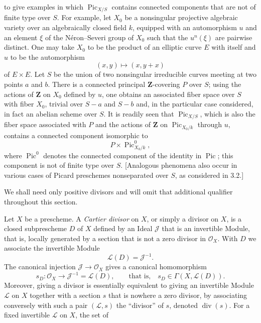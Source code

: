 to give examples in which $\operatorname{Pic}_{X/S}$ contains connected
components that are not of finite type over $S$. For example, let $X_0$ be a
nonsingular projective algebraic variety over an algebraically closed field
$k$, equipped with an automorphism $u$ and an element $\xi$ of the
Néron--Severi group of $X_0$ such that the $u^n(\xi)$ are pairwise distinct.
One may take $X_0$ to be the product of an elliptic curve $E$ with itself and
$u$ to be the automorphism
\[
(x,y)\longmapsto(x,y+x)
\]
of $E\times E$. Let $S$ be the union of two nonsingular irreducible curves
meeting at two points $a$ and $b$. There is a connected principal
$\mathbf Z$-covering $P$ over $S$; using the actions of $\mathbf Z$ on $X_0$
defined by $u$, one obtains an associated fiber space over $S$ with fiber
$X_0$, trivial over $S-a$ and $S-b$ and, in the particular case considered,
in fact an abelian scheme over $S$. It is readily seen that
$\operatorname{Pic}_{X/S}$, which is also the fiber space associated with $P$
and the actions of $\mathbf Z$ on $\operatorname{Pic}_{X_0/k}$ through $u$,
contains a connected component isomorphic to
\[
P\times\operatorname{Pic}^{0}_{X_0/k},
\]
where $\operatorname{Pic}^{0}$ denotes the connected component of the identity
in $\operatorname{Pic}$; this component is not of finite type over $S$.
[Analogous phenomena also occur in various cases of Picard preschemes
nonseparated over $S$, as considered in 3.2.]


We shall need only positive divisors and will omit that additional qualifier
throughout this section.

Let $X$ be a prescheme. A \emph{Cartier divisor} on $X$, or simply a divisor on
$X$, is a closed subprescheme $D$ of $X$ defined by an Ideal $\mathcal J$ that
is an invertible Module, that is, locally generated by a section that is not a
zero divisor in $\mathcal O_X$. With $D$ we associate the invertible Module
\[
\mathcal L(D)=\mathcal J^{-1}.
\]
The canonical injection $\mathcal J\longrightarrow\mathcal O_X$ gives a
canonical homomorphism
\[
s_D:\mathcal O_X\longrightarrow\mathcal J^{-1}=\mathcal L(D),
\qquad\text{that is,}\quad s_D\in\Gamma(X,\mathcal L(D)).
\]
Moreover, giving a divisor is essentially equivalent to giving an invertible
Module $\mathcal L$ on $X$ together with a section $s$ that is nowhere a zero
divisor, by associating conversely with such a pair $(\mathcal L,s)$ the
“divisor” of $s$, denoted $\operatorname{div}(s)$. For a fixed invertible
$\mathcal L$ on $X$, the set of

